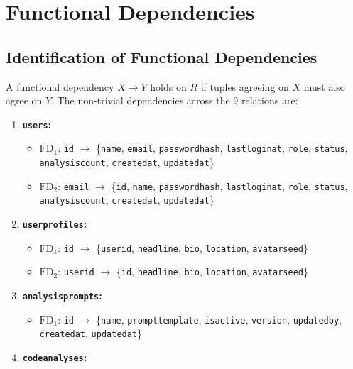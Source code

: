 \documentclass[12pt,a4paper]{report}
\DeclareRobustCommand{\_}{\textunderscore\allowbreak}
\begin{document}
\chapter{Functional Dependencies}

\section{Identification of Functional Dependencies}
A functional dependency $X \rightarrow Y$ holds on $R$ if tuples agreeing on $X$ must also agree on $Y$. The non-trivial dependencies across the 9 relations are:
\begin{enumerate}
    \item \textbf{\texttt{users}:}
    \begin{itemize}
        \item $\mathrm{FD}_1$: \texttt{id} $\rightarrow$ \{\texttt{name}, \texttt{email}, \texttt{password\_hash}, \texttt{last\_login\_at}, \texttt{role}, \texttt{status}, \texttt{analysis\_count}, \texttt{created\_at}, \texttt{updated\_at}\}
        \item $\mathrm{FD}_2$: \texttt{email} $\rightarrow$ \{\texttt{id}, \texttt{name}, \texttt{password\_hash}, \texttt{last\_login\_at}, \texttt{role}, \texttt{status}, \texttt{analysis\_count}, \texttt{created\_at}, \texttt{updated\_at}\}
    \end{itemize}
    \item \textbf{\texttt{user\_profiles}:}
    \begin{itemize}
        \item $\mathrm{FD}_1$: \texttt{id} $\rightarrow$ \{\texttt{user\_id}, \texttt{headline}, \texttt{bio}, \texttt{location}, \texttt{avatar\_seed}\}
        \item $\mathrm{FD}_2$: \texttt{user\_id} $\rightarrow$ \{\texttt{id}, \texttt{headline}, \texttt{bio}, \texttt{location}, \texttt{avatar\_seed}\}
    \end{itemize}
    \item \textbf{\texttt{analysis\_prompts}:}
    \begin{itemize}
        \item $\mathrm{FD}_1$: \texttt{id} $\rightarrow$ \{\texttt{name}, \texttt{prompt\_template}, \texttt{is\_active}, \texttt{version}, \texttt{updated\_by}, \texttt{created\_at}, \texttt{updated\_at}\}
    \end{itemize}
    \item \textbf{\texttt{code\_analyses}:}

\end{enumerate}
\end{document}
